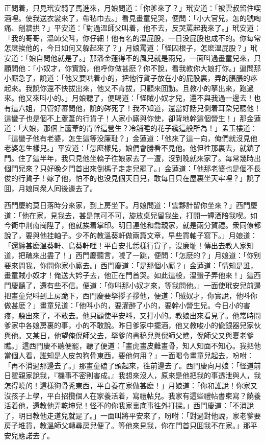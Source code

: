 正問着，只見玳安騎了馬進來，月娘問道：「你爹來了？」玳安道：「被雲叔留住喫酒哩。使我送衣裳來了，帶毡巾去。」看見畫童兒哭，便問：「小大官兒，怎的號啕痛、剜牆拱？」平安道：「對過溫師父叫着，他不去，反哭罵起我來了。」玳安道：「我的哥哥，溫師父呌，你仔細！他有名的溫屁股，一日没屁股也成不的。你每常怎麽挨他的，今日如何又躱起來了？」月娘罵道：「怪囚根子，怎麽溫屁股？」玳安道：「娘自問他就是了。」那潘金蓮得不的風兒就是雨兒，一面呌過畫童兒來，只顧問他：「小奴才，你實說，他呼你做甚麽？你不說，看我教你大娘打你。」逼問那小廝急了，說道：「他又要哄着小的，把他行貨子放在小的屁股裏，弄的脹脹的疼起來。我說你還不快拔出來，他又不肯拔，只顧來囬動。且教小的拏出來，跑過來。他又來呌小的。」月娘聽了，便喝道：「怪賊小奴才兒，還不與我過一邊去！也有這六姐，只管好審問他，說的硶死了！我不知道，還當好話兒側着耳朶兒聽他！這蠻子也是個不上蘆葦的行貨子！人家小廝與你使，卻背地幹這個營生！」那金蓮道：「大娘，那個上蘆葦的肯幹這營生？冷舖睡的花子纔這般所為！」孟玉樓道：「這蠻子他有老婆，怎生這等没廉耻？」金蓮道：「他來了這一向，俺們就沒見他老婆怎生樣兒。」平安道：「怎麽樣兒，娘們會勝看不見他。他但徃那裏去，就鎖了門。住了這半年，我只見他坐轎子徃娘家去了一遭，沒到晚就來家了。每常幾時出個門兒來？只好晚夕門首出來倒榪子走走兒罷了。」金蓮道：「他那老婆也是個不長俊的行貨子！嫁了他，怕不的也没見個天日兒，敢每日只在屋裏坐天牢哩？」說了囬，月娘同衆人囘後邊去了。

西門慶約莫日落時分來家，到上房坐下。月娘問道：「雲夥計留你坐來？」西門慶道：「他在家，見我去，甚是無可不可，旋放桌兒留我坐，打開一罈酒陪我喫。如今衛中荆南崗陞了，他就挨着掌印。明日連他和喬親家，就是兩分賀禮。衆同僚都說了，要與他挂軸子。少不的教溫葵軒做兩篇文章，早些買軸子寫下。」月娘道：「還纏甚麽溫葵軒、鳥葵軒哩！平白安扎恁樣行貨子，沒廉耻！傳出去教人家知道，把醜來出盡了！」西門慶聽言，唬了一跳，便問：「怎麽的？」月娘道：「你别要來問我，你問你家小廝去。」西門慶道：「是那個小廝？」金蓮道：「情知是誰，畫童賊小奴才！俺送大妗子去，他正在門首哭。如此這般，溫蠻子弄他來！」這西門慶聽了，還有些不信。便道：「你呌那小奴才來，等我問他。」一面使玳安兒前邊把畫童兒呌到上房跪下，西門慶要拏拶子拶他，便道：「賊奴才，你實說，他呌你做甚麽？」畫童兒道：「他呌小的，要灌醉了小的，要幹小營生兒。今日小的害疼，躱出來了，不敢去。他只顧使平安呌，又打小的。教娘出來看見了。他常時問爹家中各娘房裏的事，小的不敢說。昨日爹家中擺酒，他又教唆小的偸銀器兒家伙與他。又某日，他望俺倪師父去，拏爹的書稿兒與倪師父瞧，倪師父又與夏老爹瞧。」這西門慶不聽便罷，聽了便道：「畫虎畫皮難畫骨，知人知面不知心。我把他當個人看，誰知是人皮包狗骨東西，要他何用？」一面喝令畫童兒起去，吩咐：「再不消過那邊去了。」那畫童磕了頭起來，徃前邊去了。西門慶向月娘：「怪道前日翟親家說我，『機事不密則害成。』我想來沒人，原來是他把我的事透泄與人，我怎得曉的！這樣狗骨秃東西，平白養在家做甚麽！」月娘道：「你和誰說！你家又沒孩子上學，平白招攬個人在家養活着，寫禮帖兒。我家有這些禮帖書柬寫？饒養活着他，還教他弄乾坤兒！怪不的你我家裏底事徃外打探。」西門慶道：「不消說了，明日教他走道兒就是了。」一面叫將平安來了，吩咐：「對過對他說，家老爹要房子堆貨，教溫師父轉尋房兒便了。等他來見我，你在門首只囬我不在家。」那平安兒應諾去了。

